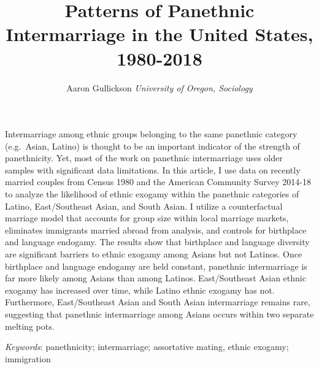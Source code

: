 \documentclass[11pt,]{article}
\title{Patterns of Panethnic Intermarriage in the United States, 1980-2018  }
\author{\Large Aaron Gullickson\vspace{0.05in} \newline\normalsize\emph{University of Oregon, Sociology}  }
\date{}
\renewenvironment{abstract}
 {{%
    \setlength{\leftmargin}{0mm}
    \setlength{\rightmargin}{\leftmargin}%
  }%
  \relax}
 {\endlist}
\begin{document}
%




{%
\setlength{\parindent}{0pt}
\thispagestyle{plain}
{\fontsize{18}{20}\selectfont\raggedright
\maketitle  %

}

{
   \vskip 13.5pt\relax \normalsize\fontsize{11}{12}
\hfill 

}

}







\begin{abstract}

    \hbox{\vrule height .2pt width 39.14pc}

    \vskip 8.5pt %

\noindent Intermarriage among ethnic groups belonging to the same panethnic category (e.g.~Asian, Latino) is thought to be an important indicator of the strength of panethnicity. Yet, most of the work on panethnic intermarriage uses older samples with significant data limitations. In this article, I use data on recently married couples from Census 1980 and the American Community Survey 2014-18 to analyze the likelihood of ethnic exogamy within the panethnic categories of Latino, East/Southeast Asian, and South Asian. I utilize a counterfactual marriage model that accounts for group size within local marriage markets, eliminates immigrants married abroad from analysis, and controls for birthplace and language endogamy. The results show that birthplace and language diversity are significant barriers to ethnic exogamy among Asians but not Latinos. Once birthplace and language endogamy are held constant, panethnic intermarriage is far more likely among Asians than among Latinos. East/Southeast Asian ethnic exogamy has increased over time, while Latino ethnic exogamy has not. Furthermore, East/Southeast Asian and South Asian intermarriage remains rare, suggesting that panethnic intermarriage among Asians occurs within two separate melting pots.


\vskip 8.5pt \noindent \emph{Keywords}: panethnicity; intermarriage; assortative mating, ethnic exogamy; immigration \par

    \hbox{\vrule height .2pt width 39.14pc}



\end{abstract}
\end{document}

